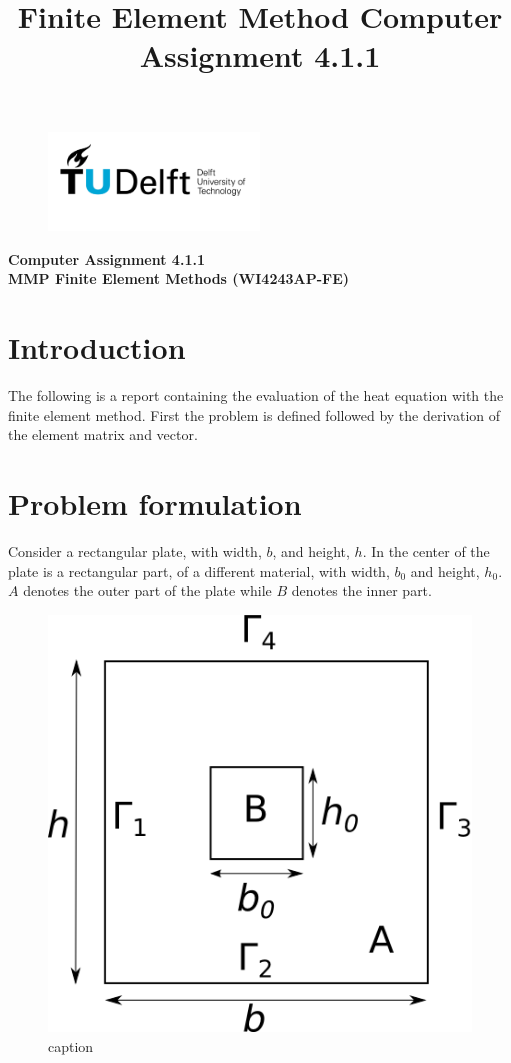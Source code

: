 \documentclass[10pt,a4paper]{article}
\title{Finite Element Method Computer Assignment 4.1.1}
\begin{document}
\begin{figure}[t]
	\centering
	\includegraphics[width=0.5\textwidth]{TU_d_line_P1_color_1.jpg}
\end{figure}

\begin{center}
	\textbf{Computer Assignment 4.1.1}\\
	\textbf{MMP Finite Element Methods (WI4243AP-FE)}
\end{center}

\section{Introduction}
The following is a report containing the evaluation of the heat equation with the finite element method.
First the problem is defined followed by the derivation of the element matrix and vector.

\section{Problem formulation}
Consider a rectangular plate, with width, $b$, and height, $h$. In the center of the plate is a rectangular part, of a different material, with width, $b_0$ and height, $h_0$. $A$ denotes the outer part of the plate while $B$ denotes the inner part.

	\begin{figure}[t]
		\centering
		\includegraphics{schem.png}
		\caption{caption}
		\label{fig:schem}
	
	\end{figure}
\end{document}
